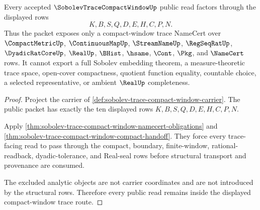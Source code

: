 \begin{theorem}
\label{thm:sobolev-trace-compact-window-nonescape}
Every accepted $\SobolevTraceCompactWindowUp$ public read factors through the displayed rows
$$
K,B,S,Q,D,E,H,C,P,N.
$$
Thus the packet exposes only a compact-window trace NameCert over $\CompactMetricUp$, $\ContinuousMapUp$, $\StreamNameUp$, $\RegSeqRatUp$, $\DyadicRatCoreUp$, $\RealUp$, $\BHist$, $\hsame$, $\Cont$, $\Pkg$, and $\NameCert$ rows. It cannot export a full Sobolev embedding theorem, a measure-theoretic trace space, open-cover compactness, quotient function equality, countable choice, a selected representative, or ambient $\RealUp$ completeness.
\end{theorem}
\begin{proof}
Project the carrier of \autoref{def:sobolev-trace-compact-window-carrier}. The public packet has exactly the ten displayed rows $K,B,S,Q,D,E,H,C,P,N$.

Apply \autoref{thm:sobolev-trace-compact-window-namecert-obligations} and \autoref{thm:sobolev-trace-compact-window-compact-handoff}. They force every trace-facing read to pass through the compact, boundary, finite-window, rational-readback, dyadic-tolerance, and Real-seal rows before structural transport and provenance are consumed.

The excluded analytic objects are not carrier coordinates and are not introduced by the structural rows. Therefore every public read remains inside the displayed compact-window trace route.
\end{proof}





